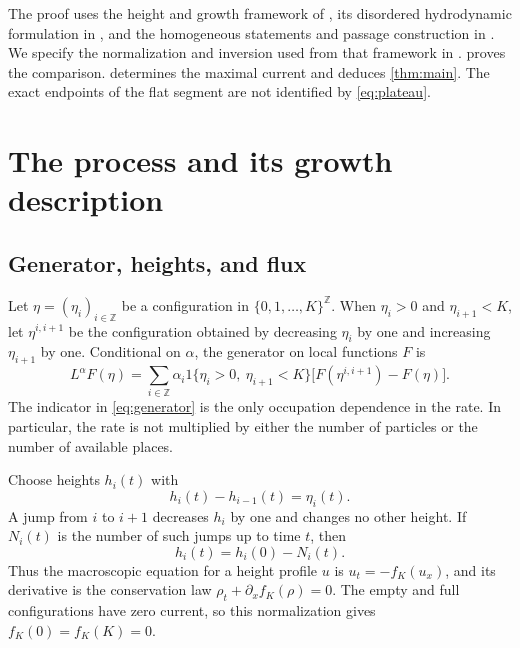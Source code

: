 \documentclass[11pt]{amsart}
\theoremstyle{remark}
\newcommand{\ZZ}{\mathbb Z}
\numberwithin{equation}{section}
\begin{document}
The proof uses the height and growth framework of \cite{SeppHydro}, its
disordered hydrodynamic formulation in \cite{SeppSurvey}, and the
homogeneous statements and passage construction in \cite{SeppNotes}.
We specify the normalization and inversion used from that framework in
.  proves the
comparison.  determines the maximal current and
deduces \cref{thm:main}. The exact endpoints of the flat segment are not
identified by \eqref{eq:plateau}.

\section{The process and its growth description}\label{sec:prelim}

\subsection{Generator, heights, and flux}
Let $\eta=(\eta_i)_{i\in\ZZ}$ be a configuration in
$\{0,1,\ldots,K\}^{\ZZ}$. When $\eta_i>0$ and $\eta_{i+1}<K$, let
$\eta^{i,i+1}$ be the configuration obtained by decreasing $\eta_i$ by
one and increasing $\eta_{i+1}$ by one. Conditional on $\alpha$, the
generator on local functions $F$ is
\begin{equation}\label{eq:generator}
 L^\alpha F(\eta)=\sum_{i\in\ZZ}\alpha_i
 \mathrm{1}\{\eta_i>0,\ \eta_{i+1}<K\}
 \bigl[F(\eta^{i,i+1})-F(\eta)\bigr].
\end{equation}
The indicator in \eqref{eq:generator} is the only occupation dependence
in the rate. In particular, the rate is not multiplied by either the
number of particles or the number of available places.

Choose heights $h_i(t)$ with
\begin{equation}\label{eq:height}
 h_i(t)-h_{i-1}(t)=\eta_i(t).
\end{equation}
A jump from $i$ to $i+1$ decreases $h_i$ by one and changes no other
height. If $N_i(t)$ is the number of such jumps up to time $t$, then
\begin{equation}\label{eq:current-normalization}
 h_i(t)=h_i(0)-N_i(t).
\end{equation}
Thus the macroscopic equation for a height profile $u$ is
$u_t=-f_K(u_x)$, and its derivative is the conservation law
$\rho_t+\partial_x f_K(\rho)=0$. The empty and full configurations have
zero current, so this normalization gives $f_K(0)=f_K(K)=0$.
\end{document}
